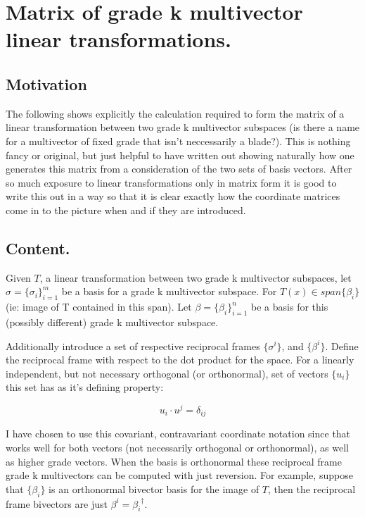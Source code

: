 \chapter{Matrix of grade k multivector linear transformations.}
\label{chap:matrixOfLinearTx}

\date{May 16, 2008.  matrixOfLinearTx.tex}

\section{Motivation }

The following shows explicitly the calculation required to form the matrix of a linear transformation between two grade k multivector subspaces (is there a name for a multivector of fixed grade that isn't neccessarily a blade?).
This is nothing fancy or original, but just helpful
to have written out showing naturally how one generates this matrix from a consideration of the two sets of basis vectors.  After so much exposure to linear transformations only in matrix
form it is good to write this out in a way so that it is clear exactly how the coordinate matrices come in to the picture when and if they are introduced.

\section{Content. }

Given $T$, a linear transformation between two grade k multivector subspaces,
let $\sigma = \{\sigma_i\}_{i=1}^m$ be a basis for a grade k multivector subspace.
For $T(x) \in span\{ \beta_i \}$ (ie: image of T contained in this span).  Let $\beta = \{\beta_i\}_{i=1}^n$ be a basis for this (possibly different) grade k multivector subspace.

Additionally introduce a set of respective reciprocal frames $\{\sigma^i\}$, and $\{\beta^i\}$.
Define the reciprocal frame with respect to the dot product for the space.  For a linearly independent, but not necessary orthogonal (or orthonormal), set of vectors $\{u_i\}$ this set 
has as it's defining property:

\[
u_i \cdot u^j = \delta_{ij}
\]

I have chosen to use this covariant, contravariant coordinate notation since that works well for both vectors (not necessarily orthogonal or orthonormal), as well as higher grade vectors.  When the basis is orthonormal these reciprocal frame grade k multivectors can be computed with just reversion.  For example, suppose that $\{\beta_i\}$ is an orthonormal bivector basis for the image of $T$, then the reciprocal frame bivectors are just $\beta^i = {\beta_i}^\dagger$.

